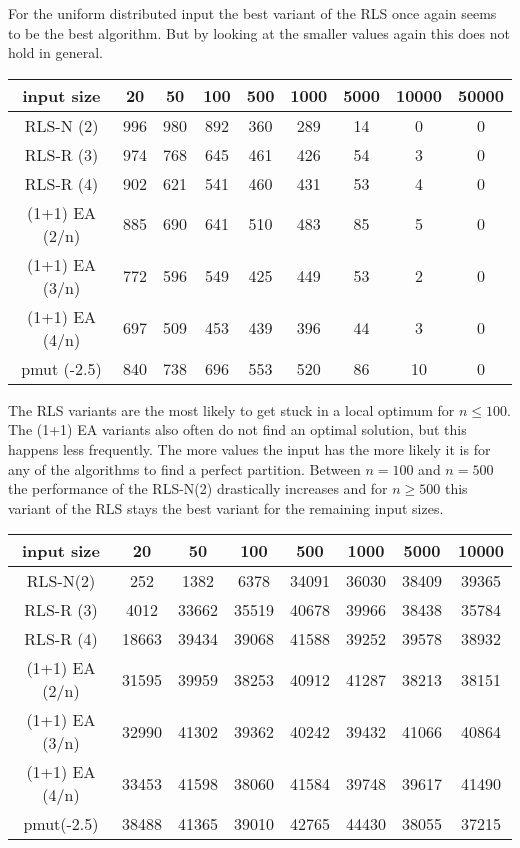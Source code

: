 For the uniform distributed input the best variant of the RLS once again seems to be the best algorithm.
But by looking at the smaller values again this does not hold in general.

\begin{tabular}[h]{ccccccccc}
      input size     & 20  & 50  & 100 & 500 & 1000 & 5000 & 10000 & 50000 \\\hline
      RLS-N (2)      & 996 & 980 & 892 & 360 & 289  & 14   & 0     & 0     \\
      RLS-R (3)      & 974 & 768 & 645 & 461 & 426  & 54   & 3     & 0     \\
      RLS-R (4)      & 902 & 621 & 541 & 460 & 431  & 53   & 4     & 0     \\
      (1+1) EA (2/n) & 885 & 690 & 641 & 510 & 483  & 85   & 5     & 0     \\
      (1+1) EA (3/n) & 772 & 596 & 549 & 425 & 449  & 53   & 2     & 0     \\
      (1+1) EA (4/n) & 697 & 509 & 453 & 439 & 396  & 44   & 3     & 0     \\
      pmut (-2.5)    & 840 & 738 & 696 & 553 & 520  & 86   & 10    & 0     \\
\end{tabular}

The RLS variants are the most likely to get stuck in a local optimum for $n\le100$. The (1+1) EA variants also often do not find an optimal solution, but this happens less frequently. The more values the input has the more likely it is for any of the algorithms to find a perfect partition. Between $n=100$ and $n=500$ the performance of the RLS-N(2) drastically increases and for $n\ge500$ this variant of the RLS stays the best variant for the remaining input sizes.

\begin{tabular}[h]{cccccccc}
      input size     & 20    & 50    & 100   & 500   & 1000  & 5000  & 10000 \\\hline
      RLS-N(2)       & 252   & 1382  & 6378  & 34091 & 36030 & 38409 & 39365 \\
      RLS-R (3)      & 4012  & 33662 & 35519 & 40678 & 39966 & 38438 & 35784 \\
      RLS-R (4)      & 18663 & 39434 & 39068 & 41588 & 39252 & 39578 & 38932 \\
      (1+1) EA (2/n) & 31595 & 39959 & 38253 & 40912 & 41287 & 38213 & 38151 \\
      (1+1) EA (3/n) & 32990 & 41302 & 39362 & 40242 & 39432 & 41066 & 40864 \\
      (1+1) EA (4/n) & 33453 & 41598 & 38060 & 41584 & 39748 & 39617 & 41490 \\
      pmut(-2.5)     & 38488 & 41365 & 39010 & 42765 & 44430 & 38055 & 37215 \\
\end{tabular}

